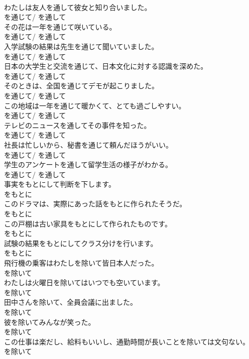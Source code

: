 \documentclass[8pt]{extreport}
\begin{document}
\begin{CJK}{UTF8}{min}
\\	わたしは友人を通して彼女と知り合いました。	
\\	を通じて/ を通して
\\	その花は一年を通じて咲いている。	
\\	を通じて/ を通して
\\	入学試験の結果は先生を通じて聞いていました。	
\\	を通じて/ を通して
\\	日本の大学生と交流を通じて、日本文化に対する認識を深めた。	
\\	を通じて/ を通して
\\	そのときは、全国を通じてデモが起こりました。	
\\	を通じて/ を通して
\\	この地域は一年を通じて暖かくて、とても過ごしやすい。	
\\	を通じて/ を通して
\\	テレビのニュースを通してその事件を知った。	
\\	を通じて/ を通して
\\	社長は忙しいから、秘書を通じて頼んだほうがいい。	
\\	を通じて/ を通して
\\	学生のアンケートを通して留学生活の様子がわかる。	
\\	を通じて/ を通して
\\	事実をもとにして判断を下します。	
\\	をもとに
\\	このドラマは、実際にあった話をもとに作られたそうだ。	
\\	をもとに
\\	この戸棚は古い家具をもとにして作られたものです。	
\\	をもとに
\\	試験の結果をもとにしてクラス分けを行います。	
\\	をもとに
\\	飛行機の乗客はわたしを除いて皆日本人だった。	
\\	を除いて
\\	わたしは火曜日を除いてはいつでも空いています。	
\\	を除いて
\\	田中さんを除いて、全員会議に出ました。	
\\	を除いて
\\	彼を除いてみんなが笑った。	
\\	を除いて
\\	この仕事は楽だし、給料もいいし、通勤時間が長いことを除いては文句ない。	
\\	を除いて

\end{CJK}
\end{document}
